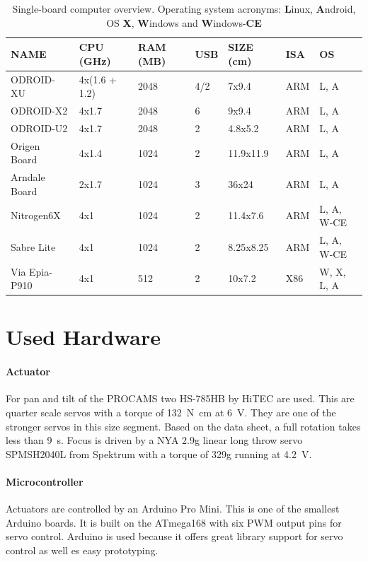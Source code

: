 \begin{table}[htb]
\begin{tabularx}{\textwidth}{ l l X l X l l}
\toprule
NAME & CPU (GHz) & RAM (MB) & USB & SIZE (cm) & \acs{ISA} & \acs{OS} \\
\midrule
 ODROID-XU & 4x(1.6 + 1.2) & 2048 & 4/2 & 7x9.4 & ARM & L, A \\
 ODROID-X2  & 4x1.7 & 2048 & 6 & 9x9.4 & ARM & L, A \\
 ODROID-U2 & 4x1.7 & 2048 & 2 & 4.8x5.2 & ARM & L, A \\
 Origen Board & 4x1.4 & 1024 & 2 & 11.9x11.9 & ARM & L, A \\
 Arndale Board & 2x1.7 & 1024 & 3 & 36x24 & ARM & L, A \\
 Nitrogen6X & 4x1 & 1024 & 2 & 11.4x7.6 & ARM & L, A, W-CE \\
 Sabre Lite  & 4x1 & 1024 & 2 & 8.25x8.25 & ARM & L, A, W-CE \\
 Via Epia-P910 & 4x1 & 512 & 2 & 10x7.2 & X86 & W, X, L, A \\
\bottomrule
\end{tabularx}

\caption{Single-board computer overview. Operating system acronyms: \textbf{L}inux, \textbf{A}ndroid, OS \textbf{X}, \textbf{W}indows and  \textbf{W}indows-\textbf{CE}}
\label{tab:sbc}
\end{table}

\section{Used Hardware}
\paragraph{Actuator}
For pan and tilt of the PROCAMS two HS-785HB by HiTEC are used. This are quarter scale servos with a torque of \SI{132}{\N\cm} at \SI{6}{\volt}. They are one of the stronger servos in this size segment. Based on the data sheet, a full rotation takes less than \SI{9}{\second}.
Focus is driven by a NYA 2.9g linear long throw servo SPMSH2040L from Spektrum with a torque of 329g running at \SI{4.2}{\volt}.

\paragraph{Microcontroller}
Actuators are controlled by an Arduino Pro Mini. This is one of the smallest Arduino boards. It is built on the ATmega168 with six PWM output pins for servo control. Arduino is used because it offers great library support for servo control as well es easy prototyping. 

